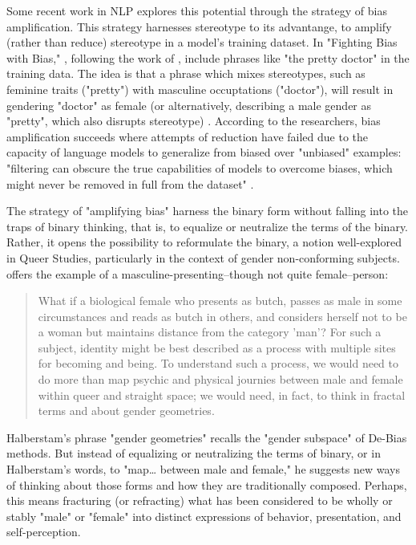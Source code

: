 \documentclass[11pt]{article}
\begin{document}
Some recent work in NLP explores this potential through the strategy
of bias amplification. This strategy harnesses stereotype to its
advantange, to amplify (rather than reduce) stereotype in a model's
training dataset. In "Fighting Bias with Bias," \citet{reif:2023},
following the work of \citet{stanovsky:2019}, include phrases like
"the pretty doctor" in the training data. The idea is that a phrase
which mixes stereotypes, such as feminine traits ("pretty") with
masculine occuptations ("doctor"), will result in gendering "doctor"
as female (or alternatively, describing a male gender as "pretty",
which also disrupts stereotype) \citep{stanovsky:2019}. According to
the researchers, bias amplification succeeds where attempts of
reduction have failed due to the capacity of language models to
generalize from biased over "unbiased" examples: "filtering can
obscure the true capabilities of models to overcome biases, which
might never be removed in full from the dataset" \citep{reif:2023}.

The strategy of "amplifying bias" harness the binary form without
falling into the traps of binary thinking, that is, to equalize or
neutralize the terms of the binary. Rather, it opens the possibility
to reformulate the binary, a notion well-explored in Queer Studies,
particularly in the context of gender non-conforming
subjects. \citet{halberstam:1998} offers the example of a
masculine-presenting--though not quite female--person:
\begin{quote}
What if a biological female who presents as butch, passes as male in
some circumstances and reads as butch in others, and considers herself
not to be a woman but maintains distance from the category 'man'? For
such a subject, identity might be best described as a process with
multiple sites for becoming and being. To understand such a process,
we would need to do more than map psychic and physical journies
between male and female within queer and straight space; we would
need, in fact, to think in fractal terms and about gender geometries.
\end{quote}
Halberstam's phrase "gender geometries" recalls the "gender subspace"
of De-Bias methods. But instead of equalizing or neutralizing the
terms of binary, or in Halberstam's words, to "map\ldots{} between
male and female," he suggests new ways of thinking about those forms
and how they are traditionally composed. Perhaps, this means
fracturing (or refracting) what has been considered to be wholly or
stably "male" or "female" into distinct expressions of behavior,
presentation, and self-perception.
\end{document}

